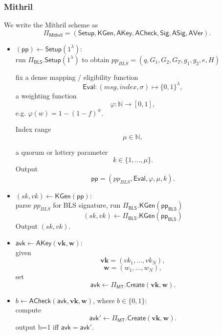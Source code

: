\documentclass{article}
\begin{document}
\subsubsection{Mithril}

We write the Mithril scheme as
\[
  \Pi_{\mathsf{Mithril}}
  =
  (\mathsf{Setup}, \mathsf{KGen}, \mathsf{AKey}, \mathsf{ACheck}, \mathsf{Sig}, \mathsf{ASig}, \mathsf{AVer}).
\]

\begin{itemize}

  \item $(\mathsf{pp}) \leftarrow \mathsf{Setup}(1^\lambda)$:\\
        run $\Pi_{\mathsf{BLS}}.\mathsf{Setup}(1^\lambda)$ to obtain $pp_{BLS} = (q,G_1,G_2,G_T,g_1,g_2,e,H)$
        
        fix a dense mapping / eligibility function
        \[
        \mathsf{Eval} : ( msg, index, \sigma) \mapsto \{0,1\}^\lambda,
        \]
        a weighting function
        \[
          \varphi : \mathbb{N} \to [0,1],
        \]
        e.g. $\varphi(w) = 1-(1-f)^w$.

        Index range
        \[
          \mu \in \mathbb{N}, 
        \]

        a quorum or lottery parameter
        \[
          k \in \{1,\dots,\mu\}.
        \]
        Output
        \[
          \mathsf{pp}=(pp_{BLS},\mathsf{Eval},\varphi,\mu,k).
        \]

  \item $(sk,vk) \leftarrow \mathsf{KGen}(\mathsf{pp})$:\\
        parse $pp_{BLS}$ for BLS signature, run $\Pi_{\mathsf{BLS}}.\mathsf{KGen}(\mathsf{pp_{BLS}})$ 
        \[
          (sk,vk) \leftarrow \Pi_{\mathsf{BLS}}.\mathsf{KGen}(\mathsf{pp_{BLS}})
        \]
        Output $(sk,vk)$.

  \item $\mathsf{avk} \leftarrow \mathsf{AKey}(\mathbf{vk},\mathbf{w})$:\\
        given
        \[
          \mathbf{vk}=(vk_1,\dots,vk_N),
        \]
        \[
          \mathbf{w}=(w_1,\dots,w_N),
        \]
        set
        \[
          \mathsf{avk} \leftarrow \Pi_{\mathsf{MT}}.\mathsf{Create}(\mathbf{vk},\mathbf{w}).
        \]

  \item $b \leftarrow \mathsf{ACheck}(\mathsf{avk},\mathbf{vk},\mathbf{w})$, where $b\in\{0,1\}$:\\
        compute
        \[
          \mathsf{avk'} \leftarrow \Pi_{\mathsf{MT}}.\mathsf{Create}(\mathbf{vk},\mathbf{w}).
        \]
        output b=1 iff $\mathsf{avk}=\mathsf{avk'}$. 


\end{itemize}
\end{document}
